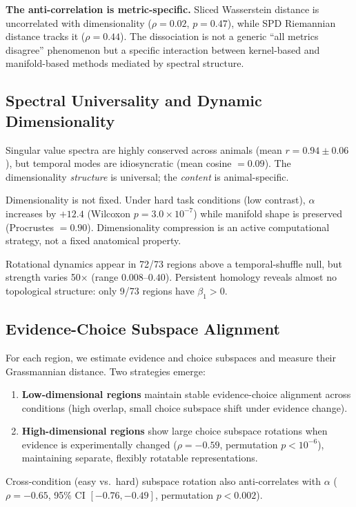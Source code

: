 \documentclass{article}
\begin{document}
\textbf{The anti-correlation is metric-specific.} Sliced Wasserstein distance is uncorrelated with dimensionality ($\rho = 0.02$, $p = 0.47$), while SPD Riemannian distance tracks it ($\rho = 0.44$). The dissociation is not a generic ``all metrics disagree'' phenomenon but a specific interaction between kernel-based and manifold-based methods mediated by spectral structure.

\subsection{Spectral Universality and Dynamic Dimensionality}

Singular value spectra are highly conserved across animals (mean $r = 0.94 \pm 0.06$), but temporal modes are idiosyncratic (mean cosine $= 0.09$). The dimensionality \emph{structure} is universal; the \emph{content} is animal-specific.

Dimensionality is not fixed. Under hard task conditions (low contrast), $\alpha$ increases by $+12.4$ (Wilcoxon $p = 3.0 \times 10^{-7}$) while manifold shape is preserved (Procrustes $= 0.90$). Dimensionality compression is an active computational strategy, not a fixed anatomical property.

Rotational dynamics appear in 72/73 regions above a temporal-shuffle null, but strength varies 50$\times$ (range $0.008$--$0.40$). Persistent homology reveals almost no topological structure: only 9/73 regions have $\beta_1 > 0$.

\subsection{Evidence-Choice Subspace Alignment}

For each region, we estimate evidence and choice subspaces and measure their Grassmannian distance. Two strategies emerge:

\begin{enumerate}
\item \textbf{Low-dimensional regions} maintain stable evidence-choice alignment across conditions (high overlap, small choice subspace shift under evidence change).
\item \textbf{High-dimensional regions} show large choice subspace rotations when evidence is experimentally changed ($\rho = -0.59$, permutation $p < 10^{-6}$), maintaining separate, flexibly rotatable representations.
\end{enumerate}

Cross-condition (easy vs.\ hard) subspace rotation also anti-correlates with $\alpha$ ($\rho = -0.65$, 95\% CI $[-0.76, -0.49]$, permutation $p < 0.002$).
\end{document}
